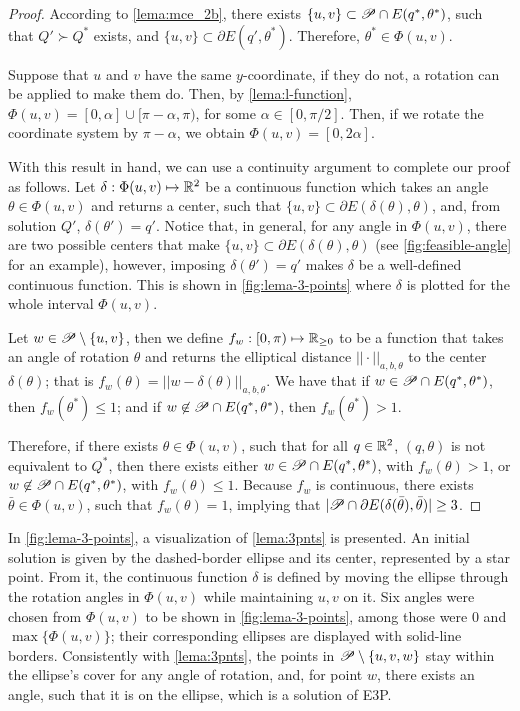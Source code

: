 \begin{proof}
	According to \autoref{lema:mce_2b}, there exists $\{u, v\} \subset \mathscr{P} \cap E(q^*, \theta^*)$, such that $Q' \succ Q^*$ exists, and $\{u, v\} \subset \partial E(q', \theta^*)$. Therefore, $\theta^*\in\Phi(u,v)$.
	
	Suppose that $u$ and $v$ have the same $y$-coordinate, if they do not, a rotation can be applied to make them do. Then, by \autoref{lema:l-function}, $\Phi(u,v)=[0, \alpha] \cup [\pi-\alpha, \pi)$, for some $\alpha \in [0, \pi/2]$. Then, if we rotate the coordinate system by $\pi-\alpha$, we obtain $\Phi(u,v)=[0, 2\alpha]$.
	
	With this result in hand, we can use a continuity argument to complete our proof as follows.
	Let $\delta : \Phi(u,v) \mapsto \mathbb{R}^2$ be a continuous function which takes an angle $\theta\in\Phi(u,v)$ and returns a center, such that $\{u,v\} \subset \partial E(\delta(\theta), \theta)$, and, from solution $Q'$, $\delta(\theta') = q'$. Notice that, in general, for any angle in $\Phi(u,v)$, there are two possible centers that make $\{u,v\} \subset \partial E(\delta(\theta), \theta)$ (see \autoref{fig:feasible-angle} for an example), however, imposing $\delta(\theta') = q'$ makes $\delta$ be a well-defined continuous function. This is shown in \autoref{fig:lema-3-points} where $\delta$ is plotted for the whole interval $\Phi(u,v)$.
	
	Let $w\in \mathscr{P} \setminus \{u,v\}$, then we define $f_w  : [0, \pi) \mapsto \mathbb{R}_{\ge0}$ to be a function that takes an angle of rotation $\theta$ and returns the elliptical distance $||\cdot||_{a,b,\theta}$ to the center $\delta(\theta)$; that is $f_w(\theta)=||w-\delta(\theta)||_{a,b,\theta}$.
	We have that if $w \in \mathscr{P} \cap E(q^*, \theta^*)$, then $f_w(\theta^*) \le 1$; and if $w \not\in \mathscr{P} \cap E(q^*, \theta^*)$, then $f_w(\theta^*) > 1$.
	
	Therefore, if there exists $\theta\in\Phi(u,v)$, such that for all $q\in\mathbb{R}^2$, $(q, \theta)$ is not equivalent to $Q^*$, then there exists either $w \in \mathscr{P} \cap E(q^*, \theta^*)$, with $f_w(\theta)>1$, or $w \not\in \mathscr{P} \cap E(q^*, \theta^*)$, with $f_w(\theta)\le 1$. Because $f_w$ is continuous, there exists $\bar{\theta}\in\Phi(u,v)$, such that $f_w(\theta)=1$, implying that $|\mathscr{P} \cap \partial E(\delta(\bar{\theta}), \bar{\theta})| \ge 3$.
\end{proof}

In \autoref{fig:lema-3-points}, a visualization of \autoref{lema:3pnts} is presented.
An initial solution is given by the dashed-border ellipse and its center, represented by a star point. From it, the continuous function $\delta$ is defined by moving the ellipse through the rotation angles in $\Phi(u,v)$ while maintaining $u, v$ on it. Six angles were chosen from $\Phi(u,v)$ to be shown in \autoref{fig:lema-3-points}, among those were $0$ and $\max\{\Phi(u,v)\}$; their corresponding ellipses are displayed with solid-line borders.
Consistently with \autoref{lema:3pnts}, the points in $\mathscr{P} \setminus \{u, v, w\}$ stay within the ellipse's cover for any angle of rotation, and, for point $w$, there exists an angle, such that it is on the ellipse, which is a solution of E3P.

